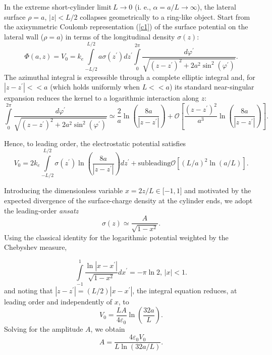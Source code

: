 \documentclass[12pt]{article}
\begin{document}
In the extreme short-cylinder limit$\ L\rightarrow0$ (i. e., $\alpha
=a/L\rightarrow\infty$), the lateral surface $\rho=a$, $\left|  z\right|
<L/2$ collapses geometrically to a ring-like object. Start from the
axisymmetric Coulomb representation (\ref{c1}) of the surface potential on the
lateral wall ($\rho=a$) in terms of the longitudinal density $\sigma(z) $:%
\begin{equation}
\Phi(a,z)=V_{0}=k_{e}\int\limits_{-L/2}^{L/2}a\sigma(z^{\prime})dz^{\prime
}\int\limits_{0}^{2\pi}\frac{d\varphi^{\prime}}{\sqrt{\left(  z-z^{\prime
}\right)  ^{2}+2a^{2}\sin^{2}(\varphi^{\prime})}}. \label{c13c}%
\end{equation}
The azimuthal integral is expressible through a complete elliptic integral
and, for $\left|  z-z^{\prime}\right|  <<a$ (which holds uniformly when
$L<<a$) its standard near-singular expansion reduces the kernel to a
logarithmic interaction along $z$:%
\begin{equation}
\int\limits_{0}^{2\pi}\frac{d\varphi^{\prime}}{\sqrt{\left(  z-z^{\prime
}\right)  ^{2}+2a^{2}\sin^{2}(\varphi^{\prime})}}\simeq\frac{2}{a}\ln\left(
\frac{8a}{\left|  z-z^{\prime}\right|  }\right)  +\mathcal{O}\left[
\frac{\left(  z-z^{\prime}\right)  ^{2}}{a^{3}}\ln\left(  \frac{8a}{\left|
z-z^{\prime}\right|  }\right)  \right]  . \label{c13d}%
\end{equation}

Hence, to leading order, the electrostatic potential satisfies%
\begin{equation}
V_{0}=2k_{e}\int\limits_{-L/2}^{L/2}\sigma(z^{\prime})\ln\left(
\frac{8a}{\left|  z-z^{\prime}\right|  }\right)  dz^{\prime}+\text{subleading
}\mathcal{O}\left[  \left(  L/a\right)  ^{2}\ln\left(  a/L\right)  \right]  .
\label{c13e}%
\end{equation}

Introducing the dimensionless variable $x=2z/L\in\lbrack-1,1]$ and motivated
by the expected divergence of the surface-charge density at the cylinder ends,
we adopt the leading-order \textit{ansatz}%
\begin{equation}
\sigma(z)\simeq\frac{A}{\sqrt{1-x^{2}}}. \label{c13f}%
\end{equation}
Using the classical identity for the logarithmic potential weighted by the
Chebyshev measure\cite{tab},%

\begin{equation}
\int\limits_{-1}^{1}\frac{\ln\left|  x-x^{\prime}\right|  }{\sqrt{1-x^{2}}%
}dx^{\prime}=-\pi\ln2\text{, }\left|  x\right|  <1. \label{c13g}%
\end{equation}
and noting that $\left|  z-z^{\prime}\right|  =(L/2)\left|  x-x^{\prime
}\right|  $, the integral equation reduces, at leading order and independently
of $x$, to%
\begin{equation}
V_{0}=\frac{LA}{4\varepsilon_{0}}\ln\left(  \frac{32a}{L}\right)  .
\label{c13h}%
\end{equation}
Solving for the amplitude $A$, we obtain%
\begin{equation}
A=\frac{4\varepsilon_{0}V_{0}}{L\ln(32a/L)}. \label{c13i}%
\end{equation}
\end{document}
